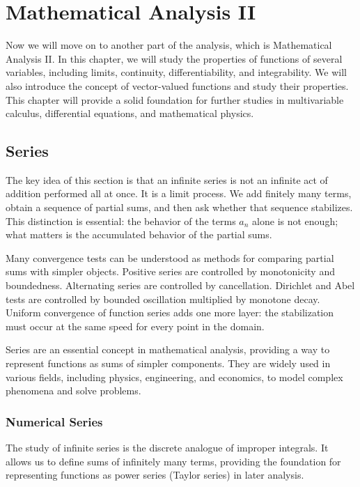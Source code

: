 \chapter{Mathematical Analysis II}

Now we will move on to another part of the analysis, which is Mathematical Analysis II. In this chapter, we will study the properties of functions of several variables, including limits, continuity, differentiability, and integrability. We will also introduce the concept of vector-valued functions and study their properties. This chapter will provide a solid foundation for further studies in multivariable calculus, differential equations, and mathematical physics.

\section{Series}


The key idea of this section is that an infinite series is not an infinite act of addition performed all at once. It is a limit process. We add finitely many terms, obtain a sequence of partial sums, and then ask whether that sequence stabilizes. This distinction is essential: the behavior of the terms $a_n$ alone is not enough; what matters is the accumulated behavior of the partial sums.

Many convergence tests can be understood as methods for comparing partial sums with simpler objects. Positive series are controlled by monotonicity and boundedness. Alternating series are controlled by cancellation. Dirichlet and Abel tests are controlled by bounded oscillation multiplied by monotone decay. Uniform convergence of function series adds one more layer: the stabilization must occur at the same speed for every point in the domain.

Series are an essential concept in mathematical analysis, providing a way to represent functions as sums of simpler components. They are widely used in various fields, including physics, engineering, and economics, to model complex phenomena and solve problems.

\subsection{Numerical Series}

The study of infinite series is the discrete analogue of improper integrals. It allows us to define sums of infinitely many terms, providing the foundation for representing functions as power series (Taylor series) in later analysis.

